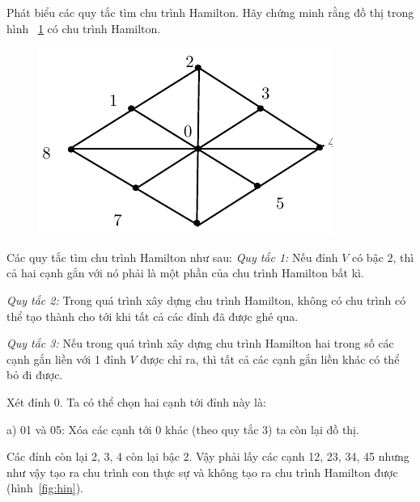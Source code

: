 \documentclass[11pt]{article}
\begin{document}
\begin{shortanswer}[title={\relax}, rearrange=no]
\begin{question}%
Phát biểu các quy tắc tìm chu trình Hamilton. Hãy chứng minh rằng đồ thị trong hình ~\ref{fig:hinh1} có chu trình Hamilton.
\begin{figure}[!ht]
\centering
\includegraphics[scale =0.8]{hamilton}
\caption{}\label{fig:hinh1}
\end{figure}
\begin{answer}
Các quy tắc tìm chu trình Hamilton như sau:
{\it Quy tắc 1:}
Nếu đỉnh $V$ có bậc $2$, thì cả hai cạnh gắn với nó phải là một phần của chu trình Hamilton bất kì.

{\it Quy tắc 2:}
Trong quá trình xây dựng chu trình Hamilton, không có chu trình có thể tạo thành cho tới khi tất cả các đỉnh đã được ghé qua.

{\it Quy tắc 3:}
Nếu trong quá trình xây dựng chu trình Hamilton hai trong số các cạnh gắn liền với 1 đỉnh $V$ được chỉ ra, thì tất cả các cạnh gắn liền khác có thể bỏ đi được.


Xét đỉnh 0. Ta có thể chọn hai cạnh tới đỉnh này là: 

a) 01 và 05:  Xóa các cạnh tới 0 khác (theo quy tắc 3) ta còn lại đồ thị.

Các đỉnh còn lại 2, 3, 4 còn lại bậc 2. Vậy phải lấy các cạnh 12, 23, 34, 45 nhưng như vậy tạo ra chu trình con thực sự và không tạo ra chu trình Hamilton được (hình~\ref{fig:hin}).


\end{answer}
\end{question}
\end{shortanswer}
\end{document}
